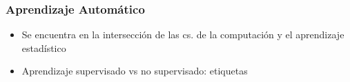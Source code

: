 \documentclass[10pt,center]{beamer}
\begin{document}
\begin{frame}
   \frametitle{Aprendizaje Automático}
  
  \begin{itemize}
    \item Se encuentra en la intersección de las cs. de la computación y el aprendizaje estadístico
    \item Aprendizaje supervisado vs no supervisado: etiquetas 
  \end{itemize}
%  
  \begin{figure}[h]
  \captionsetup[subfigure]{labelformat=empty}
    \begin{center}
    \end{center}
  \end{figure}  
%  
\end{frame}
\end{document}
